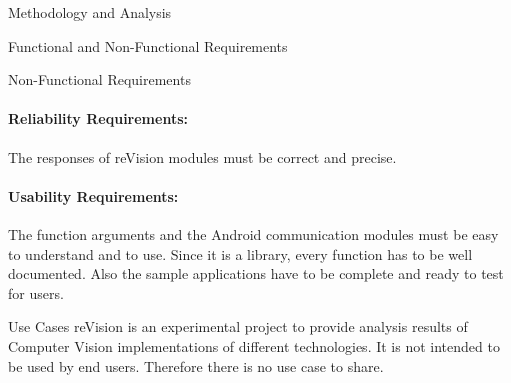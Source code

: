 \documentclass[12pt, a4paper]{article} \pagenumbering{gobble}
\begin{document}
\begin{section}{Methodology and Analysis}
\begin{subsection}{Functional and Non-Functional Requirements}
\begin{subsubsection}{Non-Functional Requirements}
      \paragraph{Reliability Requirements:}{
      The responses of reVision modules must be correct and precise.
      }
      ​
      \paragraph{Usability Requirements:}{ The function arguments and the Android communication modules must be easy
       to understand and to use. Since it is a library, every function has to be well documented. Also the sample
       applications have to be complete and ready to test for users.
      }
    \end{subsubsection}
  \end{subsection}
  \newpage
  \begin{subsection}{Use Cases}
    reVision is an experimental project to provide analysis results of Computer Vision implementations of different technologies.
    It is not intended to be used by end users. Therefore there is no use case to share.

  \end{subsection}
\end{section}
\newpage
\end{document}
